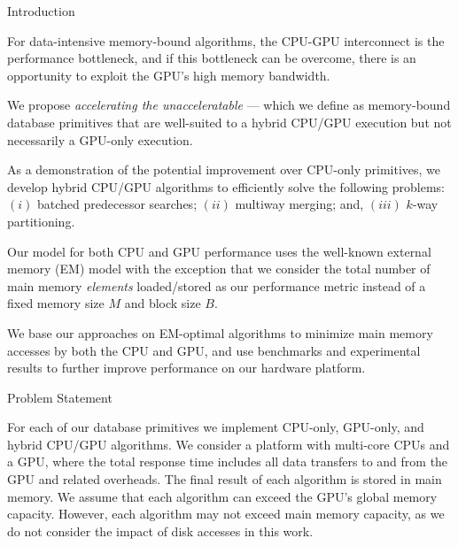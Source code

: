 \documentclass[final]{beamer}
\newlength{\colwidth}
\begin{document}
\begin{frame}[t]
\begin{columns}[t]
\begin{column}{\colwidth}
\begin{block}{Introduction}
\begin{description}[font=$\bullet$~\normalfont\scshape\color{red!50!black}]
\item For data-intensive memory-bound algorithms, the CPU-GPU interconnect is the performance bottleneck, and if this bottleneck can be overcome, there is an opportunity to exploit the GPU's high memory bandwidth.

\item We propose \emph{accelerating the unacceleratable} --- which we define as memory-bound database primitives that are well-suited to a hybrid CPU/GPU execution but not necessarily a GPU-only execution. 

\item As a demonstration of the potential improvement over CPU-only primitives, we develop hybrid CPU/GPU algorithms to efficiently solve the following problems: $(i)$ batched predecessor searches; $(ii)$ multiway merging; and, $(iii)$ $k$-way partitioning.

\item Our model for both CPU and GPU performance uses the well-known external memory (EM) model with the exception that we consider the total number of main memory \emph{elements} loaded/stored as our performance metric instead of a fixed memory size $M$ and block size $B$.

\item  We base our approaches on EM-optimal algorithms to minimize main memory accesses by both the CPU and GPU, and use benchmarks and experimental results to further improve performance on our hardware platform.

\end{description}  

  \end{block}

  \begin{alertblock}{Problem Statement}

   For each of our database primitives we implement CPU-only, GPU-only, and hybrid CPU/GPU algorithms. 
   We consider a platform with multi-core CPUs and a GPU, where the total response time includes all 
   data transfers to and from the GPU and related overheads. The final result of each algorithm is 
   stored in main memory. We assume that each algorithm can exceed the GPU's global memory capacity. 
   However, each algorithm may not exceed main memory capacity, as we do not consider the impact of disk accesses in this work.

  \end{alertblock}

\end{column}


\end{columns}
\end{frame}
\end{document}
